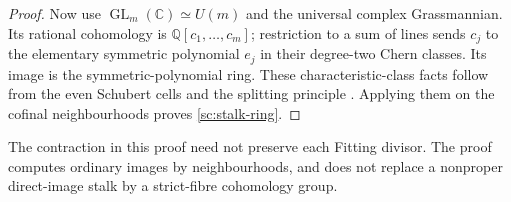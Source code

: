 \begin{proof}
Now use $\operatorname{GL}_m(\mathbb C)\simeq U(m)$ and the
universal complex Grassmannian. Its rational cohomology is
$\mathbb Q[c_1,\ldots,c_m]$; restriction to a sum of lines sends
$c_j$ to the elementary symmetric polynomial $e_j$ in their
degree-two Chern classes. Its image is the symmetric-polynomial
ring. These characteristic-class facts follow from the even
Schubert cells and the splitting principle
\cite[Theorems~3.2,3.9]{Hatcher2017}.
Applying them on the cofinal neighbourhoods proves
\eqref{sc:stalk-ring}.
\end{proof}

The contraction in this proof need not preserve each Fitting divisor.
The proof computes ordinary images by neighbourhoods, and does not
replace a nonproper direct-image stalk by a strict-fibre cohomology
group.


